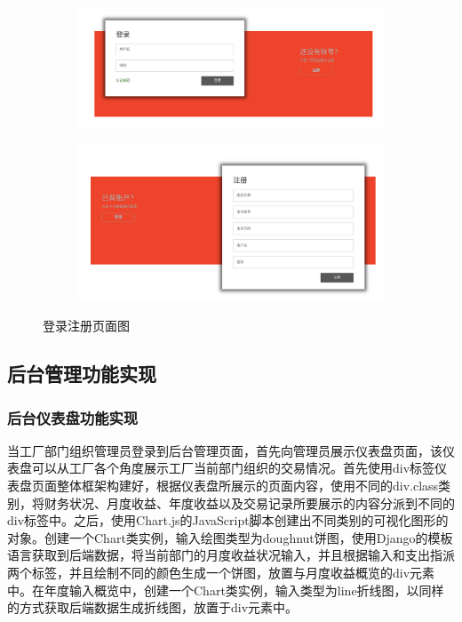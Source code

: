 \begin{figure}[H]
    \centering
    \begin{subfigure}{.45\textwidth}
        \centering
        \includegraphics[width=\textwidth]{figures/5login.png}
    \end{subfigure}
    \qquad
    \begin{subfigure}{.45\textwidth}
        \centering
        \includegraphics[width=\textwidth]{figures/5register.png}
    \end{subfigure}
    \caption{登录注册页面图}
    \label{fig:loginregisterf}
\end{figure}

\subsection{后台管理功能实现}

\subsubsection{后台仪表盘功能实现}

当工厂部门组织管理员登录到后台管理页面，首先向管理员展示仪表盘页面，该仪表盘可以从工厂各个角度展示工厂当前部门组织的交易情况。首先使用div标签仪表盘页面整体框架构建好，根据仪表盘所展示的页面内容，使用不同的div.class类别，将财务状况、月度收益、年度收益以及交易记录所要展示的内容分派到不同的div标签中。之后，使用Chart.js的JavaScript脚本创建出不同类别的可视化图形的对象。创建一个Chart类实例，输入绘图类型为doughnut饼图，使用Django的模板语言获取到后端数据，将当前部门的月度收益状况输入，并且根据输入和支出指派两个标签，并且绘制不同的颜色生成一个饼图，放置与月度收益概览的div元素中。在年度输入概览中，创建一个Chart类实例，输入类型为line折线图，以同样的方式获取后端数据生成折线图，放置于div元素中。

